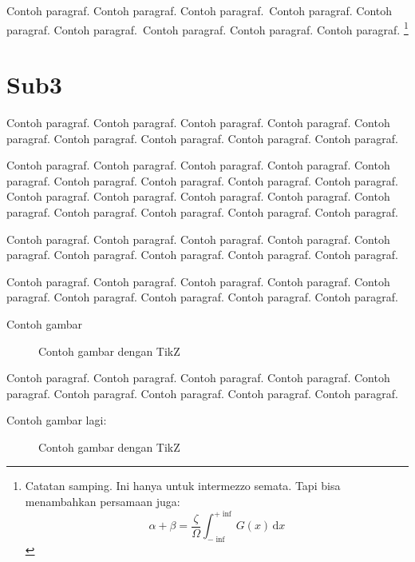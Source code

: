 \documentclass[a4paper,twoside,bahasa,nobib]{tufte-book}
\begin{document}
Contoh paragraf. Contoh paragraf. Contoh paragraf.~Contoh paragraf.
Contoh paragraf. Contoh paragraf.~Contoh paragraf. Contoh paragraf.
Contoh paragraf.
\footnote{Catatan samping. Ini hanya untuk
intermezzo semata. Tapi bisa menambahkan persamaan juga:
\begin{equation}
\alpha + \beta = \frac{\zeta}{\Omega} \int_{-\inf}^{+\inf} G(x)\,\mathrm{d}x
\end{equation}
}


\section{Sub3}

Contoh paragraf. Contoh paragraf. Contoh paragraf. Contoh paragraf.
Contoh paragraf. Contoh paragraf. Contoh paragraf. Contoh paragraf.
Contoh paragraf.

Contoh paragraf. Contoh paragraf. Contoh paragraf. Contoh paragraf.
Contoh paragraf. Contoh paragraf. Contoh paragraf. Contoh paragraf.
Contoh paragraf.
Contoh paragraf. Contoh paragraf. Contoh paragraf. Contoh paragraf.
Contoh paragraf. Contoh paragraf. Contoh paragraf. Contoh paragraf.
Contoh paragraf.

Contoh paragraf. Contoh paragraf. Contoh paragraf. Contoh paragraf.
Contoh paragraf. Contoh paragraf. Contoh paragraf. Contoh paragraf.
Contoh paragraf.

Contoh paragraf. Contoh paragraf. Contoh paragraf. Contoh paragraf.
Contoh paragraf. Contoh paragraf. Contoh paragraf. Contoh paragraf.
Contoh paragraf.

Contoh gambar
\begin{figure}[h]
\caption{Contoh gambar dengan TikZ}
\end{figure}

Contoh paragraf. Contoh paragraf. Contoh paragraf. Contoh paragraf.
Contoh paragraf. Contoh paragraf. Contoh paragraf. Contoh paragraf.
Contoh paragraf.


Contoh gambar lagi:
\begin{figure}[h]
{\centering
{}
\par
}
\caption{Contoh gambar dengan TikZ}
\end{figure}
\end{document}
